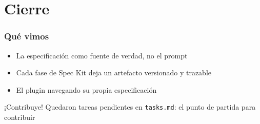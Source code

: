 \section{Cierre}
\begin{frame}
    \frametitle{Qué vimos}
    \begin{itemize}
        \item La especificación como fuente de verdad, no el prompt
        \item Cada fase de Spec Kit deja un artefacto versionado y trazable
        \item El plugin navegando su propia especificación
    \end{itemize}
    \begin{alertblock}{¡Contribuye!}
        Quedaron tareas pendientes en \texttt{tasks.md}: el punto de partida para contribuir
    \end{alertblock}
\end{frame}
